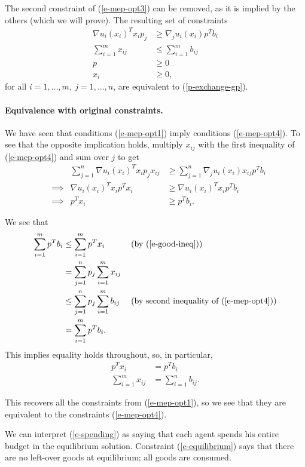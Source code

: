 \documentclass[12pt]{article}
\begin{document}
The second constraint of (\ref{e-mep-opt3}) can be removed, as it is implied by
the others (which we will prove). The resulting set of constraints
\begin{equation}
\begin{aligned}
\nabla u_i(x_i)^T x_i p_j &\geq \nabla_j u_i(x_i) p^T b_i\\
\sum_{i=1}^m x_{ij} &\leq \sum_{i=1}^m b_{ij}\\
p &\geq 0\\
x_i &\geq 0,
\end{aligned}
\label{e-mep-opt4}
\end{equation}
for all $i=1,\ldots,m,\ j=1,\ldots,n$, are equivalent to (\ref{p-exchange-gp}).

\paragraph{Equivalence with original constraints.}
We have seen that conditions (\ref{e-mep-opt1}) imply conditions (\ref{e-mep-opt4}).
To see that the opposite implication holds,
multiply $x_{ij}$ with the first inequality of (\ref{e-mep-opt4}) and sum over $j$ to get
\begin{align}
&&\sum_{j=1}^n \nabla u_i(x_i)^T x_i p_j x_{ij} &\geq \sum_{j=1}^n \nabla_j u_i(x_i) x_{ij} p^T b_i \nonumber \\
&\implies & \nabla u_i(x_i)^T x_i p^T x_i &\geq \nabla u_i(x_i)^T x_i p^T b_i \nonumber\\
&\implies & p^T x_i &\geq p^T b_i. \label{e-good-ineq}
\end{align}

We see that
\begin{align*}
\sum_{i=1}^m p^T b_i &\leq \sum_{i=1}^m p^T x_i\ &&\text{(by (\ref{e-good-ineq}))}\\
&= \sum_{j=1}^n p_j \sum_{i=1}^m x_{ij} &&\\
&\leq \sum_{j=1}^n p_j \sum_{i=1}^m b_{ij}\ &&\text{(by second inequality of (\ref{e-mep-opt4}))}\\
&= \sum_{i=1}^m p^T b_i.&&
\end{align*}
This implies equality holds throughout, so, in particular,
\begin{align}
p^T x_i &= p^T b_i \label{e-spending}\\
\sum_{i=1}^m x_{ij} &= \sum_{i=1}^n b_{ij} \label{e-equilibrium}.
\end{align}

This recovers all the constraints from (\ref{e-mep-opt1}), so we see that they
are equivalent to the constraints (\ref{e-mep-opt4}).

We can interpret (\ref{e-spending}) as saying that each agent spends his entire
budget in the equilibrium solution. Constraint (\ref{e-equilibrium}) says that
there are no left-over goods at equilibrium; all goods are consumed.



\newpage


\end{document}
